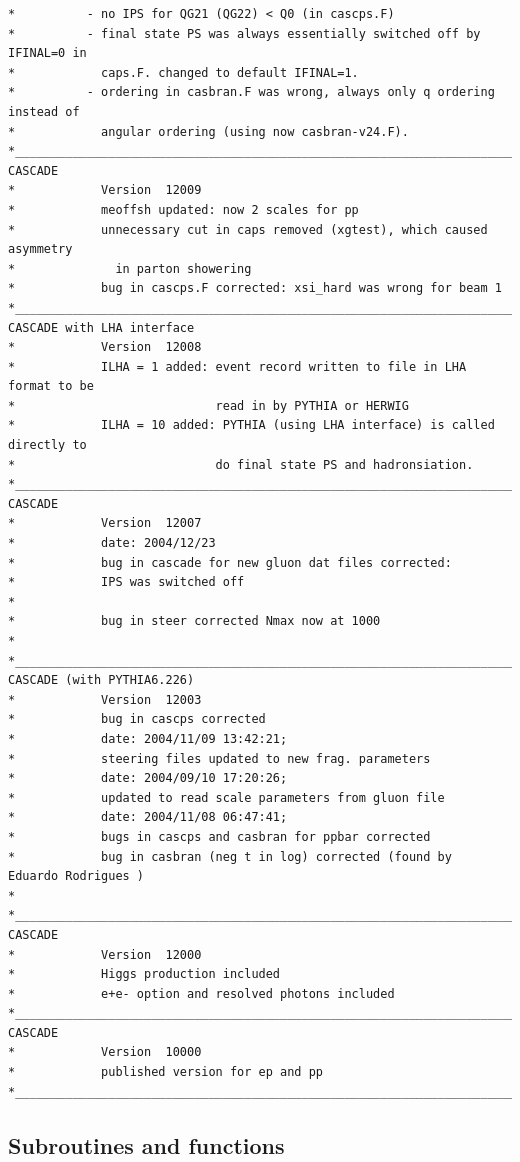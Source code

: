 \documentclass[11pt]{article} \usepackage{mystyle-new}
\begin{document}
\begin{tiny}
\begin{verbatim}
*          - no IPS for QG21 (QG22) < Q0 (in cascps.F)
*          - final state PS was always essentially switched off by IFINAL=0 in
*            caps.F. changed to default IFINAL=1.
*          - ordering in casbran.F was wrong, always only q ordering instead of
*            angular ordering (using now casbran-v24.F).
*________________________________________________________________________
CASCADE 
*            Version  12009
*            meoffsh updated: now 2 scales for pp
*            unnecessary cut in caps removed (xgtest), which caused asymmetry 
*              in parton showering
*            bug in cascps.F corrected: xsi_hard was wrong for beam 1
*________________________________________________________________________
CASCADE with LHA interface
*            Version  12008
*            ILHA = 1 added: event record written to file in LHA format to be
*                            read in by PYTHIA or HERWIG
*            ILHA = 10 added: PYTHIA (using LHA interface) is called directly to
*                            do final state PS and hadronsiation. 
*________________________________________________________________________
CASCADE 
*            Version  12007
*            date: 2004/12/23
*            bug in cascade for new gluon dat files corrected:  
*            IPS was switched off
*      
*            bug in steer corrected Nmax now at 1000 
*
*________________________________________________________________________
CASCADE (with PYTHIA6.226)
*            Version  12003
*            bug in cascps corrected 
*            date: 2004/11/09 13:42:21;  
*            steering files updated to new frag. parameters 
*            date: 2004/09/10 17:20:26; 
*            updated to read scale parameters from gluon file
*            date: 2004/11/08 06:47:41; 
*            bugs in cascps and casbran for ppbar corrected
*            bug in casbran (neg t in log) corrected (found by  Eduardo Rodrigues )
*             
*________________________________________________________________________
CASCADE  
*            Version  12000
*            Higgs production included
*            e+e- option and resolved photons included
*________________________________________________________________________
CASCADE  
*            Version  10000
*            published version for ep and pp 
*________________________________________________________________________
\end{verbatim}
\end{tiny}
\subsection{Subroutines and functions}
\end{document}
